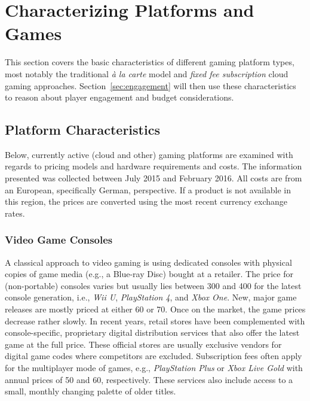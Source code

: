 \section{Characterizing Platforms and Games}
\label{sec:background}

This section covers the basic characteristics of different gaming platform types, most notably the traditional  \textit{à la carte} model and \textit{fixed fee subscription} cloud gaming approaches. Section~\ref{sec:engagement} will then use these characteristics to reason about player engagement and budget considerations.

\subsection{Platform Characteristics}

Below, currently active (cloud and other) gaming platforms are examined with regards to pricing models and hardware requirements and costs. The information presented was collected between July 2015 and February 2016. All costs are from an European, specifically German, perspective. If a product is not available in this region, the prices are converted using the most recent currency exchange rates.

\subsubsection{Video Game Consoles}

A classical approach to video gaming is using dedicated consoles with physical copies of game media (e.g., a Blue-ray Disc) bought at a retailer. The price for (non-portable) consoles varies but usually lies between \SI{300}[\EUR]{} and \SI{400}[\EUR]{} for the latest console generation, i.e., \textit{Wii U}, \textit{PlayStation 4}, and \textit{Xbox One}. New, major game releases are mostly priced at either \SI{60}[\EUR]{} or \SI{70}[\EUR]{}. Once on the market, the game prices decrease rather slowly. In recent years, retail stores have been complemented with console-specific, proprietary digital distribution services that also offer the latest game at the full price. These official stores are usually exclusive vendors for digital game codes where competitors are excluded.
Subscription fees often apply for the multiplayer mode of games, e.g., \textit{PlayStation Plus} or \textit{Xbox Live Gold} with annual prices of \SI{50}[\EUR]{} and \SI{60}[\EUR]{}, respectively. These services also include access to a small, monthly changing palette of older titles.


